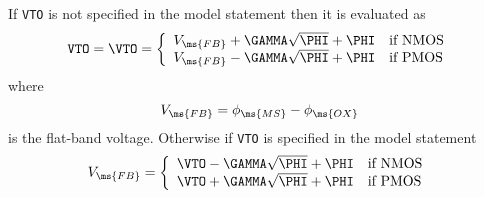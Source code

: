 If {\tt VTO} is not specified in the model statement then it is
evaluated as
\begin{equation}
{\tt VTO} = \VTO = \left\{ \begin{array}{ll}
       V_{\ms{FB}} + \GAMMA \sqrt{\PHI} + \PHI & \mbox{if NMOS} \\
       V_{\ms{FB}} - \GAMMA \sqrt{\PHI} + \PHI & \mbox{if PMOS}
      \end{array} \right. %
\end{equation}
where
\begin{equation}
V_{\ms{FB}} = \phi_{\ms{MS}} - \phi_{\ms{OX}} \label{mFB1}
\end{equation}
is the flat-band voltage. Otherwise if {\tt VTO} is specified in
the model statement
\begin{equation}
V_{\ms{FB}} = \left\{ \begin{array}{ll}
      \VTO - \GAMMA\sqrt{\PHI} +\PHI & \mbox{if NMOS}\\
      \VTO + \GAMMA\sqrt{\PHI} +\PHI & \mbox{if PMOS} \end{array}\right. %
\label{mFB2}
\end{equation}

